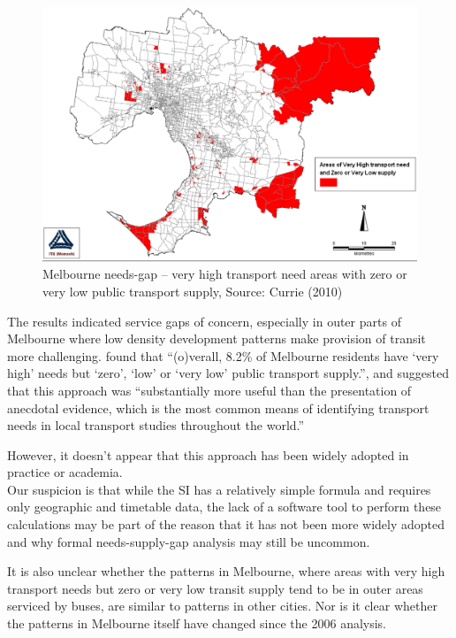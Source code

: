 \documentclass[preprint, 3p,
authoryear]{elsarticle} %
\begin{document}
\begin{figure}
\includegraphics[width=1\linewidth]{graphics/Currie2010gap} \caption{Melbourne needs-gap – very high transport need areas with zero or very low public transport supply, Source: Currie (2010)}\label{fig:Currie_map_gap}
\end{figure}

The results indicated service gaps of concern, especially in outer parts
of Melbourne where low density development patterns make provision of
transit more challenging. \citet{currie2010identifying} found that
``(o)verall, 8.2\% of Melbourne residents have `very high' needs but
`zero', `low' or `very low' public transport supply.'', and suggested
that this approach was ``substantially more useful than the presentation
of anecdotal evidence, which is the most common means of identifying
transport needs in local transport studies throughout the world.''

However, it doesn't appear that this approach has been widely adopted in
practice or academia.\\
Our suspicion is that while the SI has a relatively simple formula and
requires only geographic and timetable data, the lack of a software tool
to perform these calculations may be part of the reason that it has not
been more widely adopted and why formal needs-supply-gap analysis may
still be uncommon.

It is also unclear whether the patterns in Melbourne, where areas with
very high transport needs but zero or very low transit supply tend to be
in outer areas serviced by buses, are similar to patterns in other
cities. Nor is it clear whether the patterns in Melbourne itself have
changed since the 2006 analysis.
\end{document}
